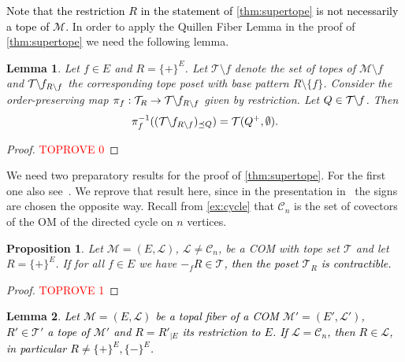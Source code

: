\documentclass[12pt]{amsart}
\def\Cscr{\mathcal C}
\def\Tscr{{\mathcal T}}
\def\M{{\mathcal M}}
\theoremstyle{plain}
\newtheorem{Lemma}{Lemma}
\numberwithin{Lemma}{\DefaultNumberTheoremWithin}
\numberwithin{Claim}{\DefaultNumberTheoremWithin}
\numberwithin{Theorem}{\DefaultNumberTheoremWithin}
\numberwithin{Corollary}{\DefaultNumberTheoremWithin}
\newtheorem{Proposition}{Proposition}
\numberwithin{Proposition}{\DefaultNumberTheoremWithin}
\numberwithin{Conjecture}{\DefaultNumberTheoremWithin}
\numberwithin{Situation}{\DefaultNumberTheoremWithin}
\numberwithin{Note}{\DefaultNumberTheoremWithin}
\theoremstyle{definition}
\numberwithin{Definition}{\DefaultNumberTheoremWithin}
\theoremstyle{definition}
\numberwithin{Question}{\DefaultNumberTheoremWithin}
\theoremstyle{definition}
\numberwithin{Problem}{\DefaultNumberTheoremWithin}
\theoremstyle{remark} \newtheorem{Remark}{Remark}
\numberwithin{Remark}{\DefaultNumberTheoremWithin}
\theoremstyle{remark}
\numberwithin{Example}{\DefaultNumberTheoremWithin}
\numberwithin{Case}{Lemma}
\numberwithin{Step}{Lemma}
\newcommand{\new}[1]{\textcolor{black}{#1}}
\begin{document}
\new{Note that the restriction $R$ in the statement of  \ref{thm:supertope} is not necessarily a tope of $\M$.} In order to apply the Quillen Fiber Lemma in the proof of \ref{thm:supertope}
we need the following lemma. 

\begin{Lemma}
  \label{lem:fiberisst} Let $f \in E$ and $R=\{+\}^E$. Let $\Tscr\setminus f$
  denote the set of topes of $\M \setminus f$ and
  $\Tscr\hspace{-.1cm}\setminus \hspace{-.1cm}f_{R\setminus f}$ the corresponding tope poset with base pattern $R\setminus \{f\}$. Consider the order-preserving map $\pi_{f}:\Tscr_R \to \Tscr\hspace{-.1cm}\setminus \hspace{-.1cm}f_{R\setminus f}$ given by restriction.  Let $Q \in \Tscr\hspace{-.1cm}\setminus \hspace{-.1cm}f$. Then
  \[\pi_{f}^{-1}((\Tscr\hspace{-.1cm}\setminus \hspace{-.1cm}f_{R\setminus f})_{\preceq Q})=\Tscr(Q^+,\emptyset).\]
\end{Lemma}
\begin{proof}\textcolor{red}{TOPROVE 0}\end{proof}

We need two preparatory results for the proof of \ref{thm:supertope}. For the first one also see~\cite[Lemma 10]{HKK}. We reprove that result here, since in the presentation in~\cite{HKK} the signs are chosen the opposite way.  Recall from \ref{ex:cycle} that $\Cscr_n$ is the set of covectors of the OM of the directed cycle on $n$ vertices. 

\begin{Proposition}\label{lem:supertope}
Let $\M=(E,\mathcal{L})$, $\mathcal{L} \neq \mathcal{C}_n$, be a COM with tope set $\Tscr$ and let $R=\{+\}^E$. If for all $f\in E$ we have \new{$-_{f}R\in\Tscr$, then the poset $\Tscr_{R}$ is contractible.}
\end{Proposition}

\begin{proof}\textcolor{red}{TOPROVE 1}\end{proof}

\begin{Lemma} \label{lem:Cn} 
\new{Let $\M=(E,\mathcal{L})$ be a topal fiber of a COM $\M'=(E',\mathcal{L'})$, $R'\in \Tscr'$ a tope of $\M'$ and $R=R'_{|E}$ its restriction to $E$. If $\mathcal{L} = \mathcal{C}_n$, then $R \in \mathcal{L}$, in particular $R \neq \{+\}^E, \{-\}^E$.}

\end{Lemma}
\end{document}
